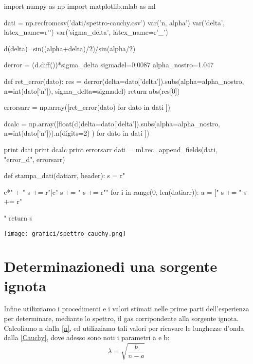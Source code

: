 \begin{sagesilent}
import numpy as np
import matplotlib.mlab as ml

dati = np.recfromcsv('dati/spettro-cauchy.csv')
var('n, alpha')
var('delta', latex_name=r'\delta')
var('sigma_delta', latex_name=r'\sigma_{\delta}')

d(delta)=sin((alpha+delta)/2)/sin(alpha/2)

derror = (d.diff())*sigma_delta
sigmadel=0.0087
alpha_nostro=1.047


def ret_error(dato):
  res = derror(delta=dato['delta']).subs(alpha=alpha_nostro, n=int(dato['n']),
                    sigma_delta=sigmadel)
  return abs(res[0])
  
errorsarr = np.array([ret_error(dato) for dato in dati ])

dcalc = np.array([float(d(delta=dato['delta']).subs(alpha=alpha_nostro, n=int(dato['n'])).n(digits=2) ) for dato in dati ])

print dati
print dcalc
print errorsarr
dati = ml.rec_append_fields(dati, "error_d", errorsarr)

def stampa_dati(datiarr, header):
  s = r"\begin{tabular}{c*{" + "%
  s += r"}{|c}}"
  s += "%
  s += r"\midrule"
  for i in range(0, len(datiarr)):
    a = ["%
    s += "%
  s += r"\end{tabular}"
  return s
\end{sagesilent}

\begin{center}
\end{center}


\begin{center}
\texttt{[image: grafici/spettro-cauchy.png]}
\end{center}

\section*{Determinazionedi una sorgente ignota}
Infine utilizziamo i procedimenti e i valori stimati nelle prime parti dell'esperienza  per determinare, mediante lo spettro, il gas corripondente alla sorgente ignota.\\

Calcoliamo n dalla \ref{n}, ed utilizziamo tali valori per ricavare le lunghezze d'onda dalla \ref{Cauchy}, dove adesso sono noti i parametri a e b:
\begin{equation}
\lambda = \sqrt{\frac{b}{n-a}}
\end{equation}


